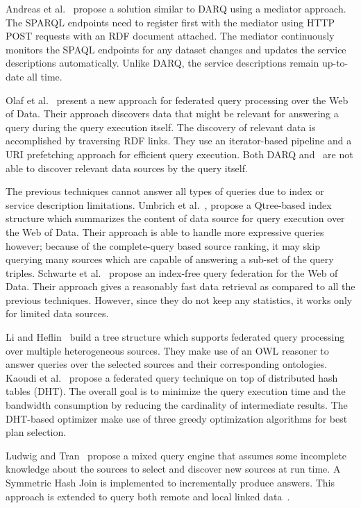 \documentclass{sig-alternate}  %
\begin{document}
Andreas et al.~\cite{key-3} propose a solution similar to DARQ using a
mediator approach. The SPARQL endpoints need to register first
with the mediator using HTTP POST requests with an RDF document attached.
The mediator continuously monitors the SPAQL endpoints for any dataset
changes and updates the service descriptions automatically. Unlike
DARQ, the service descriptions remain up-to-date all time. 

Olaf et al.~\cite{key-4} present a new approach for federated query processing
over the Web of Data. Their approach discovers data that might be
relevant for answering a query during the query execution itself.
The discovery of relevant data is accomplished by traversing RDF links.
They use an iterator-based pipeline and a URI prefetching approach
for efficient query execution. Both DARQ and~\cite{key-3} are not able
to discover relevant data sources by the query itself.

The previous techniques cannot answer all types of queries due to
index or service description limitations. Umbrich et al.~\cite{key-5, key-6}, propose a Qtree-based index structure which summarizes the
content of data source for query execution over the Web of Data. Their approach is able to handle more expressive queries however; because of the complete-query based source ranking, it may skip querying many sources which are capable of answering a sub-set of the query triples. Schwarte
et al.~\cite{key-7} propose an index-free query federation for the Web
of Data. Their approach gives a reasonably fast data retrieval as
compared to all the previous techniques. However, since they do not
keep any statistics, it works only for limited data sources.

Li and Heflin~\cite{key-15} build a tree structure which supports federated query processing over multiple heterogeneous sources. They make use of an OWL reasoner to answer queries
over the selected sources and their corresponding ontologies. Kaoudi et al.~\cite{key-16}
propose a federated query technique on top of distributed hash tables (DHT). 
 The overall goal is to minimize the query execution time and the bandwidth
consumption by reducing the cardinality of intermediate results. The DHT-based optimizer make use of three greedy optimization algorithms for best plan selection.  

Ludwig and Tran~\cite{key-18} propose a mixed
query engine that assumes some incomplete knowledge about the sources to select and discover new sources at run time. A Symmetric Hash Join
is implemented to incrementally produce answers. This approach
is extended to query both remote and local linked data~\cite{key-19}.
\end{document}
